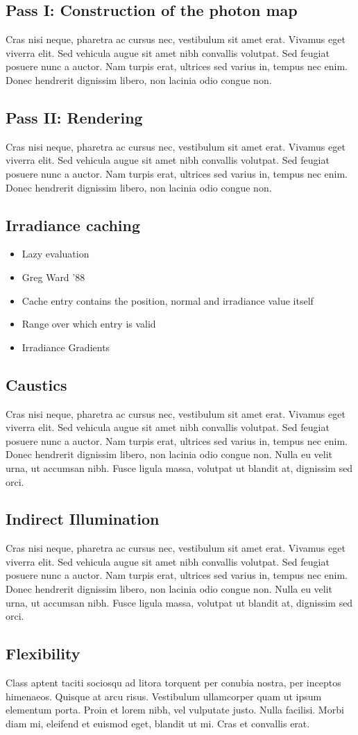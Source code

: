\subsection{Pass I: Construction of the photon map}
Cras nisi neque, pharetra ac cursus nec, vestibulum sit amet erat. Vivamus eget viverra elit. Sed vehicula augue sit amet nibh convallis volutpat. Sed feugiat posuere nunc a auctor. Nam turpis erat, ultrices sed varius in, tempus nec enim. Donec hendrerit dignissim libero, non lacinia odio congue non. 
\subsection{Pass II: Rendering}
Cras nisi neque, pharetra ac cursus nec, vestibulum sit amet erat. Vivamus eget viverra elit. Sed vehicula augue sit amet nibh convallis volutpat. Sed feugiat posuere nunc a auctor. Nam turpis erat, ultrices sed varius in, tempus nec enim. Donec hendrerit dignissim libero, non lacinia odio congue non. 
\subsection{Irradiance caching}
\begin{itemize}
\item Lazy evaluation
\item Greg Ward '88
\item Cache entry contains the position, normal and irradiance value itself
\item Range over which entry is valid
\item Irradiance Gradients
\end{itemize}
\subsection{Caustics}
Cras nisi neque, pharetra ac cursus nec, vestibulum sit amet erat. Vivamus eget viverra elit. Sed vehicula augue sit amet nibh convallis volutpat. Sed feugiat posuere nunc a auctor. Nam turpis erat, ultrices sed varius in, tempus nec enim. Donec hendrerit dignissim libero, non lacinia odio congue non. Nulla eu velit urna, ut accumsan nibh. Fusce ligula massa, volutpat ut blandit at, dignissim sed orci. 
\subsection{Indirect Illumination}
Cras nisi neque, pharetra ac cursus nec, vestibulum sit amet erat. Vivamus eget viverra elit. Sed vehicula augue sit amet nibh convallis volutpat. Sed feugiat posuere nunc a auctor. Nam turpis erat, ultrices sed varius in, tempus nec enim. Donec hendrerit dignissim libero, non lacinia odio congue non. Nulla eu velit urna, ut accumsan nibh. Fusce ligula massa, volutpat ut blandit at, dignissim sed orci. 
\subsection{Flexibility}
Class aptent taciti sociosqu ad litora torquent per conubia nostra, per inceptos himenaeos. Quisque at arcu risus. Vestibulum ullamcorper quam ut ipsum elementum porta. Proin et lorem nibh, vel vulputate justo. Nulla facilisi. Morbi diam mi, eleifend et euismod eget, blandit ut mi. Cras et convallis erat. 
